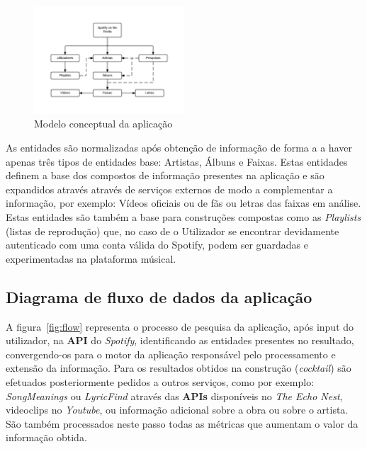 \documentclass[twocolumn,twoside,11pt,a4paper]{article}
\begin{document}
\begin{figure}[h]
    \centering
    \includegraphics[width=0.5\textwidth]{concept_model}
    \caption{Modelo conceptual da aplicação}
    \label{fig:concept}
\end{figure}

As entidades são normalizadas após obtenção de informação de forma a a haver apenas três tipos de entidades base: Artistas, Álbuns e Faixas. Estas entidades definem a base dos compostos de informação presentes na aplicação e são expandidos através através de serviços externos de modo a complementar a informação, por exemplo: Vídeos oficiais ou de fãs ou letras das faixas em análise. Estas entidades são também a base para construções compostas como as \textit{Playlists} (listas de
reprodução) que, no caso de o Utilizador se encontrar devidamente autenticado com uma conta válida do Spotify, podem ser guardadas e experimentadas na plataforma músical. \\

\subsection{Diagrama de fluxo de dados da aplicação}

A figura~\ref{fig:flow} representa o processo de pesquisa da aplicação, após input do utilizador, na \textbf{API} do \textit{Spotify}, identificando as entidades presentes no resultado, convergendo-os para o motor da aplicação responsável pelo processamento e extensão da informação.
Para os resultados obtidos na construção (\textit{cocktail}) são efetuados posteriormente pedidos
a outros serviços, como por exemplo: \textit{SongMeanings} ou \textit{LyricFind} através das \textbf{APIs} disponíveis no \textit{The Echo Nest}, videoclips no \textit{Youtube}, ou informação adicional sobre a obra ou sobre o artista. \\
São também processados neste passo todas as métricas que aumentam o valor da informação obtida.
\end{document}
